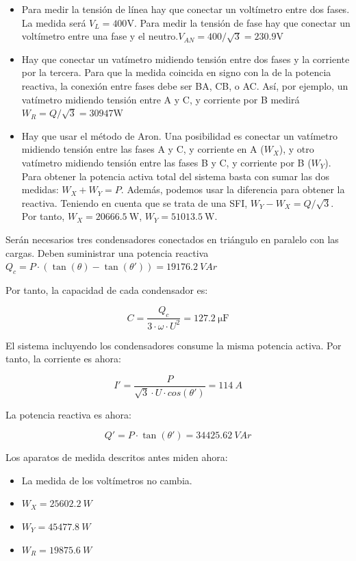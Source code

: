 \begin{itemize}

\item Para medir la tensión de línea hay que conectar un voltímetro
  entre dos fases. La medida será $V_{L} = 400\mathrm{V}$. Para medir
  la tensión de fase hay que conectar un voltímetro entre una fase y
  el neutro.$V_{AN} = 400 / \sqrt{3} = 230.9\mathrm{V}$

\item Hay que conectar un vatímetro midiendo tensión entre dos fases y
  la corriente por la tercera. Para que la medida coincida en signo
  con la de la potencia reactiva, la conexión entre fases debe ser BA,
  CB, o AC. Así, por ejemplo, un vatímetro midiendo tensión entre A y
  C, y corriente por B medirá $W_R = Q / \sqrt{3} = 30947\mathrm{W}$

\item Hay que usar el método de Aron. Una posibilidad es conectar un
  vatímetro midiendo tensión entre las fases A y C, y corriente en A
  ($W_X$), y otro vatímetro midiendo tensión entre las fases B y C, y
  corriente por B ($W_Y$). Para obtener la potencia activa total del
  sistema basta con sumar las dos medidas: $W_{X} + W_{Y} =
  P$. Además, podemos usar la diferencia para obtener la
  reactiva. Teniendo en cuenta que se trata de una SFI,
  $W_Y - W_X = Q/\sqrt{3}$. Por tanto, $W_X = \SI{20666.5}{\watt}$,
  $W_Y = \SI{51013.5}{\watt}$.

\end{itemize}


Serán necesarios tres condensadores conectados en triángulo en
paralelo con las cargas. Deben suministrar una potencia reactiva
$Q_c = P \cdot (\tan(\theta) - \tan(\theta')) = \SI{19176.2}{VAr}$

Por tanto, la capacidad de cada condensador es:

\[
  C = \frac{Q_c}{3 \cdot \omega \cdot U^2} = \SI{127.2}{\micro\farad}
\]

El sistema incluyendo los condensadores consume la misma potencia
activa. Por tanto, la corriente es ahora:

\[I' = \frac{P}{\sqrt{3} \cdot U \cdot cos(\theta')} = \SI{114}{A}\]

La potencia reactiva es ahora:

\[
  Q' = P \cdot \tan(\theta') = \SI{34425.62}{VAr}
\]

Los aparatos de medida descritos antes miden ahora:
\begin{itemize}
\item La medida de los voltímetros no cambia.
\item $W_X = \SI{25602.2}{W}$
\item $W_Y = \SI{45477.8}{W}$
\item $W_R = \SI{19875.6}{W}$
\end{itemize}



